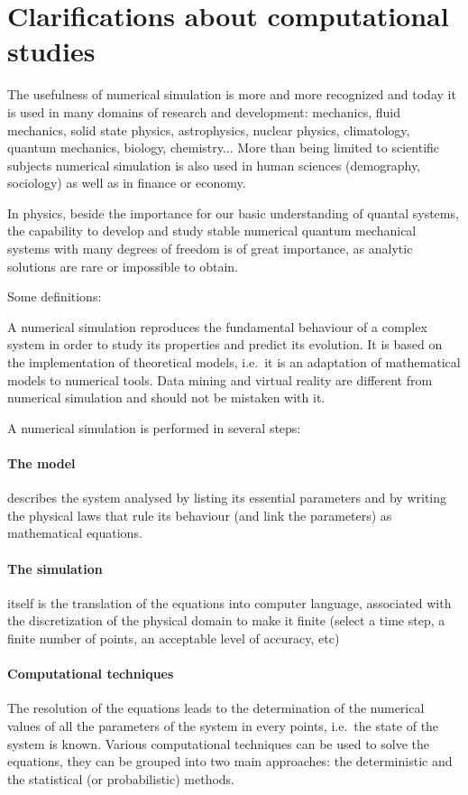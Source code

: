 \section{Clarifications about computational studies}
\label{whyCompPhys}

The usefulness of numerical simulation is more and more recognized and today it is used in many domains of research and development: mechanics, fluid mechanics, solid state physics, astrophysics, nuclear physics, climatology, quantum mechanics, biology, chemistry... More than being limited to scientific subjects numerical simulation is also used in human sciences (demography, sociology) as well as in finance or economy.

In physics, beside the importance for our basic understanding of quantal systems, the capability to develop and study stable numerical quantum mechanical systems with many degrees of freedom is of great importance, as analytic solutions are rare or impossible to obtain.

Some definitions:

A numerical simulation reproduces the fundamental behaviour of a complex 
system in order to study its properties and predict its evolution. It is based on the implementation of theoretical models, i.e.\ 
it is an adaptation of mathematical models to numerical tools.
Data mining and virtual reality are different from numerical simulation and should not be mistaken with it.

A numerical simulation is performed in several steps:
\paragraph{The model}
 describes the system analysed by listing its essential parameters and by writing the physical laws that rule its behaviour (and link the parameters) as mathematical equations.

\paragraph{The simulation}
 itself is the translation of the equations into computer language, associated with the discretization of the physical domain to make it finite (select a time step, a finite number of points, an acceptable level of accuracy, etc)

\paragraph{Computational techniques}
 The resolution of the equations leads to the determination of the numerical values of all the parameters of the 
system in every points, i.e.\ the state of the system is known.
Various computational techniques can be used to solve the equations, they can be grouped into two main approaches: the deterministic and the statistical (or probabilistic) methods.


